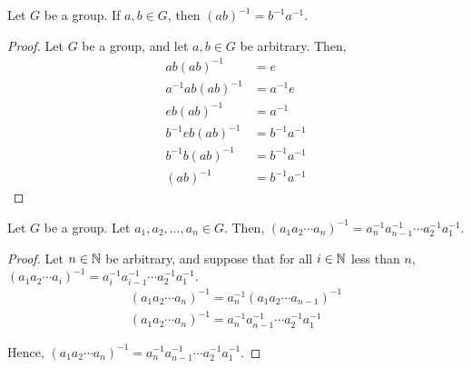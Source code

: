         \begin{thm}
            Let \(G\) be a group. If \(a, b\in G\), then \((ab)^{-1} = b^{-1}a^{-1}\).
        \end{thm}

        \begin{proof}
            Let \(G\) be a group, and let \(a,b\in G\) be arbitrary. Then,
            \begin{align*}
                ab(ab)^{-1} &= e \\
                a^{-1}ab(ab)^{-1} &= a^{-1}e \\
                eb(ab)^{-1} &= a^{-1} \\
                b^{-1}eb(ab)^{-1} &= b^{-1}a^{-1} \\
                b^{-1}b(ab)^{-1} &= b^{-1}a^{-1} \\
                (ab)^{-1} &= b^{-1}a^{-1}
            \end{align*}
        \end{proof}

        \begin{thm}
            Let \(G\) be a group. Let \(a_1, a_2, \ldots, a_n\in G\). Then,
            \((a_1a_2\cdots a_n)^{-1} = a_{n}^{-1} a_{n - 1}^{-1}\cdots a_{2}^{-1}a_{1}^{-1}\).
        \end{thm}

        \begin{proof}
            Let \(n\in \mathbb{N}\) be arbitrary, and suppose that for all \(i\in\mathbb{N}\) less than \(n\), \((a_1a_2\cdots a_i)^{-1} = a_{i}^{-1} a_{i - 1}^{-1}\cdots a_{2}^{-1}a_{1}^{-1}\).
            \begin{align*}
                (a_1a_2\cdots a_n)^{-1} = a_{n}^{-1} (a_1a_2\cdots a_{n - 1})^{-1} \\
                (a_1a_2\cdots a_n)^{-1} = a_{n}^{-1} a_{n - 1}^{-1}\cdots a_{2}^{-1}a_{1}^{-1}
            \end{align*}

            Hence, \((a_1a_2\cdots a_n)^{-1} = a_{n}^{-1} a_{n - 1}^{-1}\cdots a_{2}^{-1}a_{1}^{-1}\).
        \end{proof}
